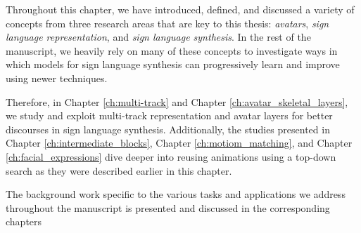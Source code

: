 \documentclass[../../main.tex]{subfiles}
\begin{document}
Throughout this chapter, we have introduced, defined, and discussed a variety of concepts from three research areas that are key to this thesis: \textit{avatars}, \textit{sign language representation}, and \textit{sign language synthesis}. In the rest of the manuscript, we heavily rely on many of these concepts to investigate ways in which models for sign language synthesis can progressively learn and improve using newer techniques.

Therefore, in Chapter \ref{ch:multi-track} and Chapter \ref{ch:avatar_skeletal_layers}, we study and exploit multi-track representation and avatar layers for better discourses in sign language synthesis. Additionally, the studies presented in Chapter \ref{ch:intermediate_blocks}, Chapter \ref{ch:motiom_matching}, and Chapter \ref{ch:facial_expressions} dive deeper into reusing animations using a top-down search as they were described earlier in this chapter.

The background work specific to the various tasks and applications we address throughout the manuscript is presented and discussed in the corresponding chapters


\end{document}
